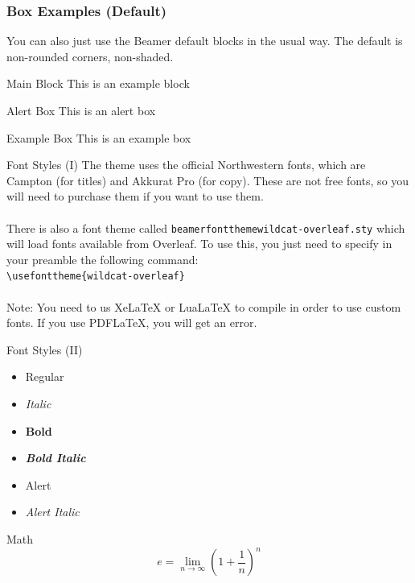 \documentclass[aspectratio=1610]{beamer}
\begin{document}
\begin{frame}
    \frametitle{Box Examples (Default)}
    You can also just use the Beamer default blocks in the usual way. The default is non-rounded corners, non-shaded.
    \begin{block}{Main Block}
    This is an example block
    \end{block}
    \begin{alertblock}{Alert Box}
    This is an alert box
    \end{alertblock}
    \begin{exampleblock}{Example Box}
        This is an example box
    \end{exampleblock}
    \end{frame}

\begin{frame}{Font Styles (I)}
    The theme uses the official Northwestern fonts, which are Campton (for titles) and Akkurat Pro (for copy). These are not free fonts, so you will need to purchase them if you want to use them.
    \\ ~ \\
    There is also a font theme called \texttt{beamerfontthemewildcat-overleaf.sty} which will load fonts available from Overleaf. To use this, you just need to specify in your preamble the following command: \\
    \texttt{\textbackslash usefonttheme\{wildcat-overleaf\}}
    \\ ~ \\
    Note: You need to us XeLaTeX or LuaLaTeX to compile in order to use custom fonts. If you use PDFLaTeX, you will get an error.
    
\end{frame}

\begin{frame}{Font Styles (II)}
    \begin{itemize}
        \item Regular
        \item \textit{Italic}
        \item \textbf{Bold}
        \item \textbf{\textit{Bold Italic}}
        \item \alert{Alert}
        \item \alert{\textit{Alert Italic}}
    \end{itemize}
\end{frame}
 
\begin{frame}{Math}
    \begin{equation*}
        e = \lim_{n \rightarrow \infty}\left(1+\frac{1}{n}\right)^{n}
    \end{equation*}
\end{frame}
\end{document}
